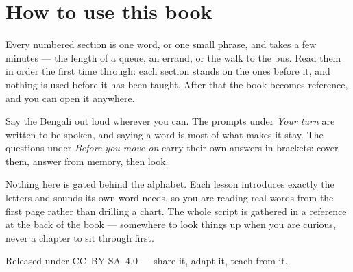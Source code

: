 \documentclass[11pt,twoside]{book}
\begin{document}
\section*{How to use this book}

Every numbered section is one word, or one small phrase, and takes a few
minutes --- the length of a queue, an errand, or the walk to the bus. Read them
in order the first time through: each section stands on the ones before it, and
nothing is used before it has been taught. After that the book becomes
reference, and you can open it anywhere.

Say the Bengali out loud wherever you can. The prompts under \emph{Your turn}
are written to be spoken, and saying a word is most of what makes it stay. The
questions under \emph{Before you move on} carry their own answers in brackets:
cover them, answer from memory, then look.

Nothing here is gated behind the alphabet. Each lesson introduces exactly the
letters and sounds its own word needs, so you are reading real words from the
first page rather than drilling a chart. The whole script is gathered in a
reference at the back of the book --- somewhere to look things up when you are
curious, never a chapter to sit through first.

Released under CC~BY-SA~4.0 --- share it, adapt it, teach from it.

\tableofcontents

\mainmatter




















\backmatter






\end{document}
